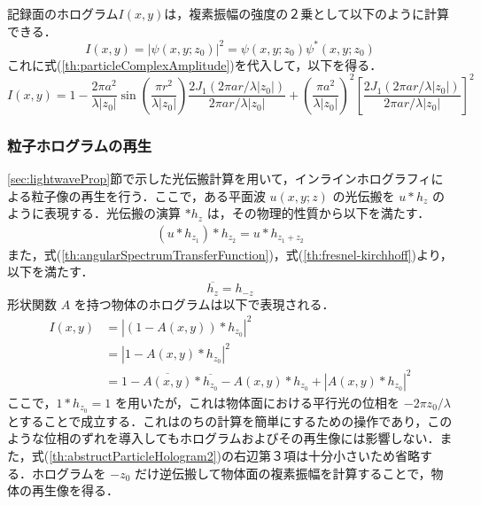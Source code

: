記録面のホログラム$I(x,y)$は，複素振幅の強度の２乗として以下のように計算できる．
\begin{equation}
    \label{th:irradiance}
    I(x,y) = |\psi(x,y;z_0)|^2 = \psi(x,y;z_0)\psi^*(x,y;z_0)
\end{equation}
これに式(\ref{th:particleComplexAmplitude})を代入して，以下を得る\cite{tyler1976}．
\begin{equation}
    \label{th:particleIrradiance}
    I(x,y) = 1 - \frac{2\pi a^2}{\lambda |z_0|} \sin{\left( \frac{\pi r^2}{\lambda |z_0|} \right)} \frac{2J_1(2\pi ar/\lambda |z_0|)}{2\pi ar / \lambda |z_0|} + \left( \frac{\pi a^2}{\lambda |z_0|} \right)^2 \left[ \frac{2J_1(2\pi ar/\lambda |z_0|)}{2\pi ar / \lambda |z_0|} \right]^2
\end{equation}

\subsubsection{粒子ホログラムの再生}\label{sec:holographicReconstruction}
\ref{sec:lightwaveProp}節で示した光伝搬計算を用いて，インラインホログラフィによる粒子像の再生を行う．ここで，ある平面波 $u(x,y;z)$ の光伝搬を $u*h_z$ のように表現する．光伝搬の演算 $*h_z$ は，その物理的性質から以下を満たす．
\begin{align}
    \label{th:lightPropOperation}
    \left( u * h_{z_1} \right) * h_{z_2} = u * h_{z_1 + z_2}
\end{align}
また，式(\ref{th:angularSpectrumTransferFunction})，式(\ref{th:fresnel-kirchhoff})より，以下を満たす．
\begin{equation}
    \label{th:lightPropOperation2}
    \overline{h_z} = h_{-z}
\end{equation}
形状関数 $A$ を持つ物体のホログラムは以下で表現される\cite{scott1987}．
\begin{align}
    \label{th:abstructParticleHologram}
    I(x,y) &= \left| \left( 1 - A(x,y) \right) * h_{z_0} \right|^2 \\
    &= \left|  1 - A(x,y)  * h_{z_0} \right|^2 \\
    \label{th:abstructParticleHologram2}
    &= 1 - \overline{A(x,y)}*\overline{h_{z_0}} - A(x,y)*h_{z_0} + \left| A(x,y) * h_{z_0} \right|^2
\end{align}
ここで，$1*h_{z_0}=1$ を用いたが，これは物体面における平行光の位相を $-2\pi z_0 /\lambda$ とすることで成立する．これはのちの計算を簡単にするための操作であり，このような位相のずれを導入してもホログラムおよびその再生像には影響しない．また，式(\ref{th:abstructParticleHologram2})の右辺第３項は十分小さいため省略する．ホログラムを $-z_0$ だけ逆伝搬して物体面の複素振幅を計算することで，物体の再生像を得る．
